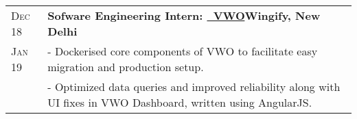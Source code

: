 \documentclass[a4paper,10pt]{extarticle} %
\begin{document}
\begin{tabularx}{\linewidth}{ l | X }
\textsc{Dec 18} & \textbf{Sofware Engineering Intern: {\href{https://vwo.com/}{\ VWO}}}\hfill\textbf{Wingify, New Delhi}\\
\textsc{Jan 19}& {- Dockerised core components of VWO to facilitate easy migration and production setup.}\\
& {- Optimized data queries and improved reliability along with UI fixes in VWO Dashboard, written using AngularJS.}\\

\end{tabularx}

\vspace{-0.3cm}
\end{document}
